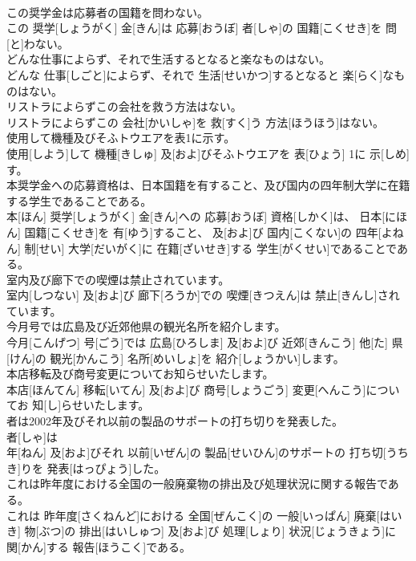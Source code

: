 \documentclass[8pt]{extreport}
\begin{document}
\begin{CJK}{UTF8}{min}
\\	この奨学金は応募者の国籍を問わない。	
\\	この 奨学[しょうがく] 金[きん]は 応募[おうぼ] 者[しゃ]の 国籍[こくせき]を 問[と]わない。
\\	どんな仕事によらず、それで生活するとなると楽なものはない。	
\\	どんな 仕事[しごと]によらず、それで 生活[せいかつ]するとなると 楽[らく]なものはない。
\\	リストラによらずこの会社を救う方法はない。	
\\	リストラによらずこの 会社[かいしゃ]を 救[すく]う 方法[ほうほう]はない。
\\	使用して機種及びそふトウエアを表1に示す。	
\\	使用[しよう]して 機種[きしゅ] 及[およ]びそふトウエアを 表[ひょう] 1に 示[しめ]す。
\\	本奨学金への応募資格は、日本国籍を有すること、及び国内の四年制大学に在籍する学生であることである。	
\\	本[ほん] 奨学[しょうがく] 金[きん]への 応募[おうぼ] 資格[しかく]は、 日本[にほん] 国籍[こくせき]を 有[ゆう]すること、 及[およ]び 国内[こくない]の 四年[よねん] 制[せい] 大学[だいがく]に 在籍[ざいせき]する 学生[がくせい]であることである。
\\	室内及び廊下での喫煙は禁止されています。	
\\	室内[しつない] 及[およ]び 廊下[ろうか]での 喫煙[きつえん]は 禁止[きんし]されています。
\\	今月号では広島及び近郊他県の観光名所を紹介します。	
\\	今月[こんげつ] 号[ごう]では 広島[ひろしま] 及[およ]び 近郊[きんこう] 他[た] 県[けん]の 観光[かんこう] 名所[めいしょ]を 紹介[しょうかい]します。
\\	本店移転及び商号変更についてお知らせいたします。	
\\	本店[ほんてん] 移転[いてん] 及[およ]び 商号[しょうごう] 変更[へんこう]についてお 知[し]らせいたします。
\\	者は2002年及びそれ以前の製品のサポートの打ち切りを発表した。	
\\	者[しゃ]は 
\\	年[ねん] 及[およ]びそれ 以前[いぜん]の 製品[せいひん]のサポートの 打ち切[うちき]りを 発表[はっぴょう]した。
\\	これは昨年度における全国の一般廃棄物の排出及び処理状況に関する報告である。	
\\	これは 昨年度[さくねんど]における 全国[ぜんこく]の 一般[いっぱん] 廃棄[はいき] 物[ぶつ]の 排出[はいしゅつ] 及[およ]び 処理[しょり] 状況[じょうきょう]に 関[かん]する 報告[ほうこく]である。

\end{CJK}
\end{document}
